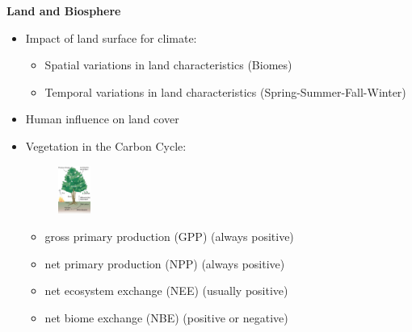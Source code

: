\documentclass[fontsize=8pt, a4paper, landscape, fleqn]{scrartcl}
\renewcommand{\subsection}[1]{%
    \noindent\colorbox{subsectioncolor}{%
        \parbox{\dimexpr\columnwidth-2\fboxsep}{\color{white}\textbf{#1}}}%
    \vspace{0.5mm}%
}
\begin{document}
\begin{multicols*}{3}[\raggedcolumns]
\subsection{Land and Biosphere}
\begin{itemize}
    \item Impact of land surface for climate:
        \begin{itemize}
            \item Spatial variations in land characteristics (Biomes)
            \item Temporal variations in land characteristics (Spring-Summer-Fall-Winter)
        \end{itemize}
    \item Human influence on land cover
    \item Vegetation in the Carbon Cycle:
    \begin{figure}
        \centering
        \includegraphics[width=0.1\textwidth]{Secondary/img/Pasted image 20250407172907.png}
    \end{figure}
        \begin{itemize}
            \item gross primary production (GPP) (always positive)
            \item net primary production (NPP) (always positive)
            \item net ecosystem exchange (NEE) (usually positive)
            \item net biome exchange (NBE) (positive or negative)
        \end{itemize}
\end{itemize}


\end{multicols*}
\end{document}
